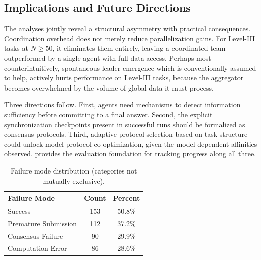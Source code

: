 \subsection{Implications and Future Directions}

The analyses jointly reveal a structural asymmetry with practical consequences. Coordination overhead does not merely reduce parallelization gains.
For Level-III tasks at $N{\geq}50$, it eliminates them entirely, leaving a coordinated team outperformed by a single agent with full data access. 
Perhaps most counterintuitively, spontaneous leader emergence which is conventionally assumed to help, actively hurts performance on Level-III tasks, because the aggregator becomes overwhelmed by the volume of global data it must process.

Three directions follow. 
First, agents need mechanisms to detect information sufficiency before committing to a final answer. 
Second, the explicit synchronization checkpoints present in successful runs should be formalized as consensus protocols. 
Third, adaptive protocol selection based on task structure could unlock model-protocol co-optimization, given the model-dependent affinities observed. \silobench{} provides the evaluation foundation for tracking progress along all three.


\begin{table}[t]
\centering
\small
\begin{tabular}{lcc}
\toprule
\textbf{Failure Mode} & \textbf{Count} & \textbf{Percent} \\
\midrule
Success & 153 & 50.8\% \\
Premature Submission & 112 & 37.2\% \\
Consensus Failure & 90 & 29.9\% \\
Computation Error & 86 & 28.6\% \\
\bottomrule
\end{tabular}
\caption{Failure mode distribution (categories not mutually exclusive).}
\label{tab:failure_modes}
\vspace{-0.3cm}
\end{table}


